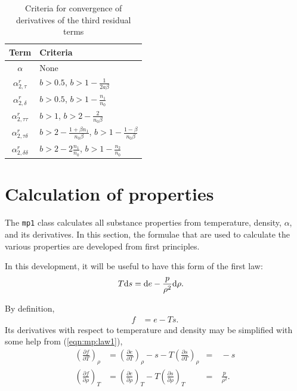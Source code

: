 \begin{table}
\centering
\caption{Criteria for convergence of derivatives of the third residual terms}
\begin{tabular}{|c|l|}
\hline
Term & Criteria \\
\hline
$\alpha$ & None \\
$\alpha^r_{2,\tau}$ & $b > 0.5$,\hspace{0.5em} $b > 1 - \frac{1}{2a\beta}$\\
$\alpha^r_{2,\delta}$ & $b > 0.5$,\hspace{0.5em} $b > 1 - \frac{n_1}{n_0}$\\
$\alpha^r_{2,\tau\tau}$ & $b > 1$,\hspace{0.5em} $b > 2 - \frac{2}{n_0 \beta}$\\
$\alpha^r_{2,\tau\delta}$ & $b > 2 - \frac{1 + \beta n_1}{n_0\beta}$,\hspace{0.5em} $b > 1 - \frac{1 - \beta}{n_0\beta}$\\
$\alpha^r_{2,\delta\delta}$ & $b > 2 - 2\frac{n_1}{n_0}$,\hspace{0.5em} $b > 1 - \frac{n_2}{n_0}$\\
\hline
\end{tabular}
\end{table}

\section{Calculation of properties}\label{sec:mp1:properties}

The \texttt{mp1} class calculates all substance properties from temperature, density, $\alpha$, and its derivatives.  In this section, the formulae that are used to calculate the various properties are developed from first principles.

In this development, it will be useful to have this form of the first law:
\begin{align}
T\mathrm{d} s &= \mathrm{d} e - \frac{p}{\rho^2} \mathrm{d} \rho\label{eqn:mp:law1}.
\end{align}

By definition,
\begin{align}
f &= e - Ts \label{eqn:mp:f}.
\end{align}
Its derivatives with respect to temperature and density may be simplified with some help from (\ref{eqn:mp:law1}),
\begin{align}
\left(\frac{\partial f}{\partial T}\right)_\rho &= \left(\frac{\partial e}{\partial T}\right)_\rho - s - T \left(\frac{\partial s}{\partial T}\right)_\rho &=& \ -s\label{eqn:mp:ft}\\
\left(\frac{\partial f}{\partial \rho}\right)_T &= \left(\frac{\partial e}{\partial \rho}\right)_T - T \left(\frac{\partial s}{\partial \rho}\right)_T &=& \ \frac{p}{\rho^2} \label{eqn:mp:fd}.
\end{align}

